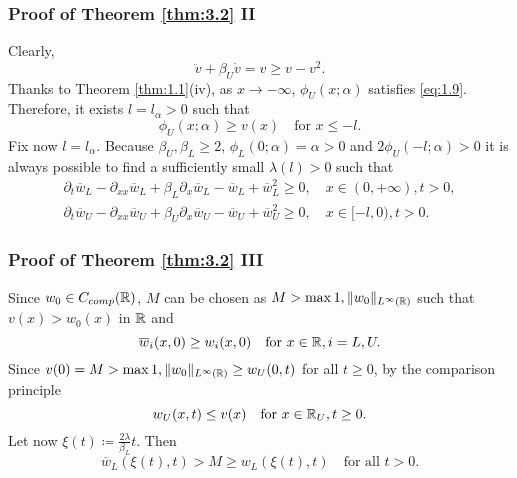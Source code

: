 \begin{frame}
    \frametitle{Proof of Theorem \ref{thm:3.2} II}
    \begin{proofc}
        Clearly,
        \[
            \ddot{v} + \beta_U \dot{v} = v \geq v - v^2.
        \]
        Thanks to Theorem \ref{thm:1.1}(iv), as \(x \to -\infty\), \(\phi_U(x; \alpha)\) satisfies \eqref{eq:1.9}. Therefore, it exists \(l = l_\alpha > 0\) such that
        \[
            \phi_U(x; \alpha) \geq v(x) \quad \text{for } x \leq -l.
        \]
        Fix now \(l = l_\alpha\). Because \(\beta_U, \beta_L \geq 2\), \(\phi_L(0;\alpha) = \alpha > 0\) and \(2\phi_U(-l;\alpha) > 0\) it is always possible to find a sufficiently small \(\lambda(l) > 0\) such that 
        \begin{align*}
            \partial_t \overline{w}_L - \partial_{xx} \overline{w}_L + \beta_L \partial_x \overline{w}_L - \overline{w}_L + \overline{w}_L^2 \geq 0, \quad x \in (0, +\infty), t > 0, \\
            \partial_t \overline{w}_U - \partial_{xx} \overline{w}_U + \beta_U \partial_x \overline{w}_U - \overline{w}_U + \overline{w}_U^2 \geq 0, \quad x \in [-l, 0), t > 0.
        \end{align*}
    \end{proofc}
\end{frame}


\begin{frame}
    \frametitle{Proof of Theorem \ref{thm:3.2} III}
    \begin{proofc}
        Since \(w_0 \in C_{comp}(\mathbb{R})\), \(M\) can be chosen as \(M > \max{1, \lVert w_0\rVert_{L^{\infty}(\mathbb{R})}}\) such that \(v(x) > w_0(x)\) in \(\mathbb{R}\) and 
        \[
            \overline{w}_i(x, 0) \geq w_i(x, 0) \quad \text{for } x \in \mathbb{R}, i = L, U.
        \] 
        Since \(v(0) = M > \max{1, \lVert w_0\rVert_{L^{\infty}(\mathbb{R})}} \geq w_U(0, t)\) for all \(t \geq 0\), by the comparison principle
        \[
            w_U(x, t) \leq v(x) \quad \text{for } x \in \mathbb{R}_U, t \geq 0.
        \]
        Let now \(\xi(t) \coloneqq \frac{2\lambda}{\beta_L} t\). Then 
        \[
            \overline{w}_L(\xi(t), t) > M \geq w_L(\xi(t), t) \quad \text{for all } t > 0.
        \]
    \end{proofc}
\end{frame}


